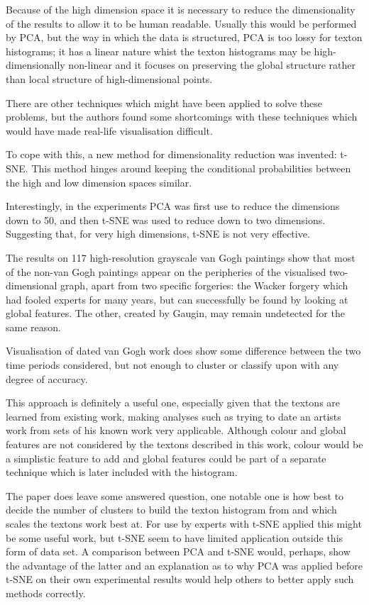 \documentclass[conference]{IEEEtran}
\begin{document}
Because of the high dimension space it is necessary to reduce the
dimensionality of the results to allow it to be human readable. Usually this
would be performed by \gls{PCA}, but the way in which the data is structured,
\gls{PCA} is too lossy for texton histograms; it has a linear nature whist the
texton histograms may be high-dimensionally non-linear and it focuses on
preserving the global structure rather than local structure of high-dimensional
points.

There are other techniques which might have been applied to solve these
problems, but the authors found some shortcomings with these techniques which
would have made real-life visualisation difficult.

To cope with this, a new method for dimensionality reduction was invented:
\gls{t-SNE}. This method hinges around keeping
the conditional probabilities between the high and low dimension spaces
similar.

Interestingly, in the experiments \gls{PCA} was first use to reduce the
dimensions down to 50, and then \gls{t-SNE} was
used to reduce down to two dimensions. Suggesting that, for very high dimensions,
\gls{t-SNE} is not very effective.

The results on 117 high-resolution grayscale van Gogh paintings show that most
of the non-van Gogh paintings appear on the peripheries of the visualised
two-dimensional graph, apart from two specific forgeries: the Wacker forgery
which had fooled experts for many years, but can successfully be found by
looking at global features. The other, created by Gaugin, may remain undetected
for the same reason.

Visualisation of dated van Gogh work does show some difference between the two
time periods considered, but not enough to cluster or classify upon with any
degree of accuracy.


This approach is definitely a useful one, especially given that the textons are
learned from existing work, making analyses such as trying to date an artists
work from sets of his known work very applicable. Although colour and global
features are not considered by the textons described in this work, colour would
be a simplistic feature to add and global features could be part of a separate
technique which is later included with the histogram.

The paper does leave some answered question, one notable one is how best to
decide the number of clusters to build the texton histogram from and which
scales the textons work best at. For use by experts with \gls{t-SNE} applied
this might be some useful work, but \gls{t-SNE} seem to have limited
application outside this form of data set. A comparison between \gls{PCA} and
\gls{t-SNE} would, perhaps, show the advantage of the latter and an explanation
as to why \gls{PCA} was applied before \gls{t-SNE} on their own experimental
results would help others to better apply such methods correctly.
\end{document}
